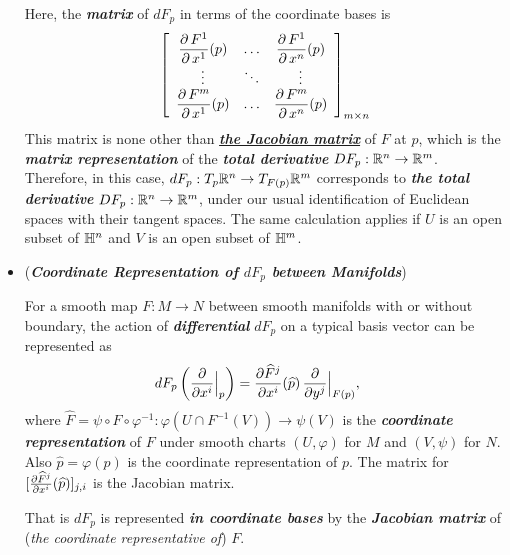 \documentclass[11pt]{article}
\begin{document}
\begin{itemize}
\begin{remark}
Here, the \emph{\textbf{matrix}} of $dF_p$ in terms of the coordinate bases is 
\begin{align}
\left[\begin{array}{ccc}
\dfrac{\partial\,F^{1}}{\partial\,x^{1}}(p)& \ldots& \dfrac{\partial\,F^{1}}{\partial\,x^{n}}(p)\\
\vdots & \ddots & \vdots\\
\dfrac{\partial\,F^{m}}{\partial\,x^{1}}(p)& \ldots& \dfrac{\partial\,F^{m}}{\partial\,x^{n}}(p)
\end{array}\right]_{m \times n}  \label{eqn: differential_coordinate_mat}
\end{align} This matrix is none other than \underline{\emph{\textbf{the Jacobian matrix}}} of $F$ at $p$, which is the \emph{\textbf{matrix representation}} of the \emph{\textbf{total derivative}} $DF_{p}: {\mathbb R}^n \rightarrow {\mathbb R}^m$. 
Therefore, in this case, $dF_p: T_{p}{\mathbb R}^n \rightarrow T_{F(p)}{\mathbb R}^m$ corresponds to \emph{\textbf{the total derivative}} $DF_{p}: {\mathbb R}^n \rightarrow {\mathbb R}^m$, under our usual identification of Euclidean spaces with their tangent spaces. The same calculation applies if $U$ is an open subset of ${\mathbb H}^n$ and $V$ is an open subset of ${\mathbb H}^m$.
\end{remark}

\item  (\emph{\textbf{Coordinate Representation of $dF_p$ between Manifolds}})
\begin{definition}
For a smooth map $F: M \rightarrow N$ between smooth manifolds with or without boundary, the action of \emph{\textbf{differential}} $dF_{p}$ on a typical basis vector can be represented as
\begin{align}
dF_{p}\left(\frac{\partial }{ \partial x^{i}}\Bigr|_{p}\right) &= \frac{\partial \widehat{F}^{j}}{ \partial x^{i}}(\widehat{p})\,\frac{\partial }{ \partial y^{j}}\Bigr|_{F(p)}, \label{eqn: differential_coordinate_manifold}
\end{align} where  $\widehat{F} = \psi \circ F \circ \varphi^{-1}: \varphi(U \cap F^{-1}(V)) \rightarrow \psi(V)$ is the \emph{\textbf{coordinate representation}} of $F$ under smooth charts $(U,\varphi)$ for $M$ and $(V, \psi)$ for $N$. Also $\widehat{p} = \varphi(p)$  is the coordinate representation of $p$. The matrix for $[\frac{\partial \widehat{F}^{j}}{ \partial x^{i}}(\widehat{p})]_{j,i}$ is the Jacobian matrix.

That is $dF_{p}$ is represented \emph{\textbf{in coordinate bases}} by the \emph{\textbf{Jacobian matrix}} of (\emph{the coordinate representative of}) $F$.
\end{definition}


\end{itemize}
\end{document}
